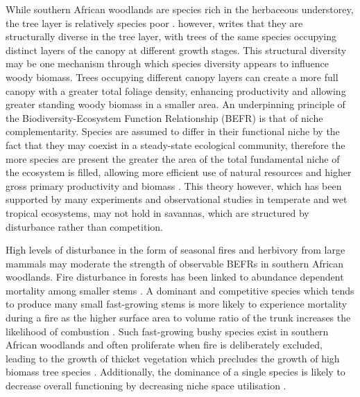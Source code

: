 \documentclass[11pt,a4paper]{article}
\begin{document}

While southern African woodlands are species rich in the herbaceous understorey, the tree layer is relatively species poor \citep{}. \citet{Miombo-Book} however, writes that they are structurally diverse in the tree layer, with trees of the same species occupying distinct layers of the canopy at different growth stages. This structural diversity may be one mechanism through which species diversity appears to influence woody biomass. Trees occupying different canopy layers can create a more full canopy with a greater total foliage density, enhancing productivity and allowing greater standing woody biomass in a smaller area. An underpinning principle of the Biodiversity-Ecosystem Function Relationship (BEFR) is that of niche complementarity. Species are assumed to differ in their functional niche by the fact that they may coexist in a steady-state ecological community, therefore the more species are present the greater the area of the total fundamental niche of the ecosystem is filled, allowing more efficient use of natural resources and higher gross primary productivity and biomass \citep{}. This theory however, which has been supported by many experiments and observational studies in temperate and wet tropical ecosystems, may not hold in savannas, which are structured by disturbance rather than competition.

High levels of disturbance in the form of seasonal fires and herbivory from large mammals \citep{Fireherbivore} may moderate the strength of observable BEFRs in southern African woodlands. Fire disturbance in forests has been linked to abundance dependent mortality among smaller stems \citep{Roques2001}. A dominant and competitive species which tends to produce many small fast-growing stems is more likely to experience mortality during a fire as the higher surface area to volume ratio of the trunk increases the likelihood of combustion \citep{}. Such fast-growing bushy species exist in southern African woodlands and often proliferate when fire is deliberately excluded, leading to the growth of thicket vegetation which precludes the growth of high biomass tree species \citep{nieto2018}. Additionally, the dominance of a single species is likely to decrease overall functioning by decreasing niche space utilisation \citep{Cardinale2002}.
\end{document}
